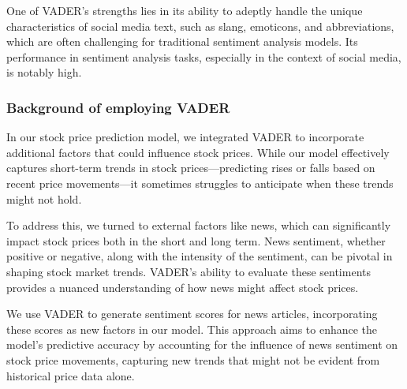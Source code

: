 One of VADER's strengths lies in its ability to adeptly handle the unique characteristics of social media text, such as slang, emoticons, and abbreviations, which are often challenging for traditional sentiment analysis models. 
Its performance in sentiment analysis tasks, especially in the context of social media, is notably high. 

\subsubsection{Background of employing VADER}

In our stock price prediction model, we integrated VADER to incorporate additional factors that could influence stock prices. 
While our model effectively captures short-term trends in stock prices—predicting rises or falls based on recent price movements—it sometimes struggles to anticipate when these trends might not hold.

To address this, we turned to external factors like news, which can significantly impact stock prices both in the short and long term. 
News sentiment, whether positive or negative, along with the intensity of the sentiment, can be pivotal in shaping stock market trends. 
VADER's ability to evaluate these sentiments provides a nuanced understanding of how news might affect stock prices.

We use VADER to generate sentiment scores for news articles, incorporating these scores as new factors in our model. 
This approach aims to enhance the model's predictive accuracy by accounting for the influence of news sentiment on stock price movements, capturing new trends that might not be evident from historical price data alone.
